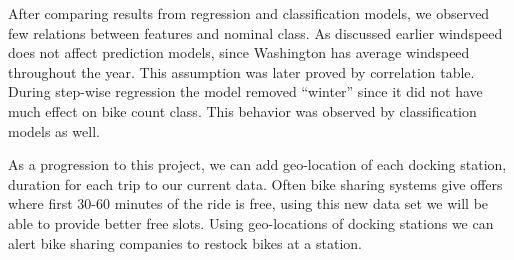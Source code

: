 \documentclass[12pt]{article}
\newcommand{\bibfile}{GroupProject}
\begin{document}

After comparing results from regression and classification models, we observed
few relations between features and nominal class. As discussed earlier
windspeed does not affect prediction models, since Washington has average
windspeed throughout the year. This assumption was later proved by correlation
table. During step-wise regression the model removed “winter” since it did not
have much effect on bike count class. This behavior was observed by
classification models as well.



As a progression to this project, we can add geo-location of each docking
station, duration for each trip to our current data. Often bike sharing systems
give offers where first 30-60 minutes of the ride is free, using this new data
set we will be able to provide better free slots. Using geo-locations of
docking stations we can alert bike sharing companies to restock bikes at a
station.



\end{document}

